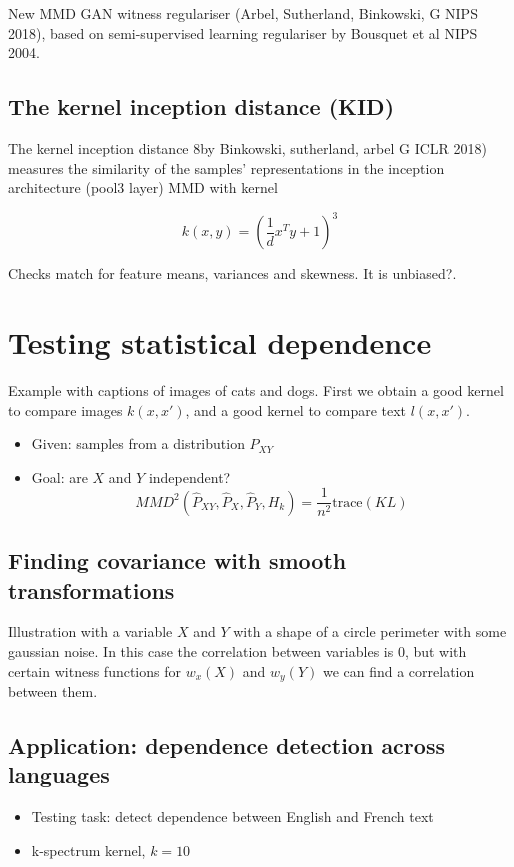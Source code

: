 New MMD GAN witness regulariser  (Arbel, Sutherland, Binkowski, G NIPS 2018),
based on semi-supervised learning regulariser by Bousquet et al NIPS 2004.

\subsection{The kernel inception distance (KID)}

The kernel inception distance 8by Binkowski, sutherland, arbel G ICLR 2018)
measures the similarity of the samples' representations in the inception
architecture (pool3 layer) MMD with kernel

\begin{equation}
  k(x,y) = (\frac{1}{d}x^Ty+1)^3
\end{equation}

Checks match for feature means, variances and skewness. It is unbiased?.

\section{Testing statistical dependence}

Example with captions of images of cats and dogs. First we obtain a good kernel
to compare images $k(x, x')$, and a good kernel to compare text $l(x, x')$.

\begin{itemize}
  \item Given: samples from a distribution $P_{XY}$
  \item Goal: are $X$ and $Y$ independent?
    \begin{equation}
      MMD^2(\hat{P}_{XY}, \hat{P}_X, \hat{P}_Y, H_k) =
      \frac{1}{n^2}\text{trace}(KL)
    \end{equation}
\end{itemize}

\subsection{Finding covariance with smooth transformations}

Illustration with a variable $X$ and $Y$ with a shape of a circle perimeter
with some gaussian noise. In this case the correlation between variables is 0,
but with certain witness functions for $w_x(X)$ and $w_y(Y)$ we can find a
correlation between them.

\subsection{Application: dependence detection across languages}

\begin{itemize}
  \item Testing task: detect dependence between English and French text
  \item k-spectrum kernel, $k=10$
\end{itemize}
